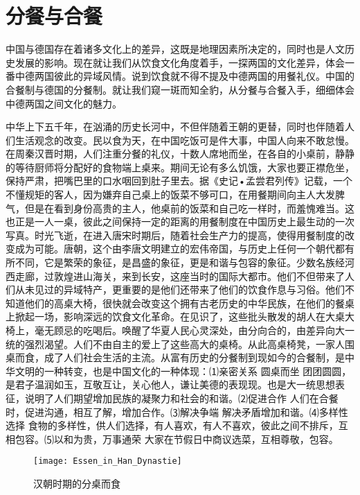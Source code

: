 \section{分餐与合餐}
\par
中国与德国存在着诸多文化上的差异，这既是地理因素所决定的，同时也是人文历史发展的影响。现在就让我们从饮食文化角度着手，一探两国的文化差异，体会一番中德两国彼此的异域风情。说到饮食就不得不提及中德两国的用餐礼仪。中国的合餐制与德国的分餐制。就让我们窥一斑而知全豹，从分餐与合餐入手，细细体会中德两国之间文化的魅力。
\par
中华上下五千年，在汹涌的历史长河中，不但伴随着王朝的更替，同时也伴随着人们生活观念的改变。民以食为天，在中国吃饭可是件大事，中国人向来不敢怠慢。在周秦汉晋时期，人们注重分餐的礼仪，十数人席地而坐，在各自的小桌前，静静的等待厨师将分配好的食物端上桌来。期间无论有多么饥饿，大家也要正襟危坐，保持严肃，把嘴巴里的口水咽回到肚子里去。据《史记•孟尝君列传》记载，一个不懂规矩的客人，因为嫌弃自己桌上的饭菜不够可口，在用餐期间向主人大发脾气，但是在看到身份高贵的主人，他桌前的饭菜和自己吃一样时，而羞愧难当。这也正是一人一桌，彼此之间保持一定的距离的用餐制度在中国历史上最生动的一次写真。时光飞逝，在进入唐宋时期后，随着社会生产力的提高，使得用餐制度的改变成为可能。唐朝，这个由李唐文明建立的宏伟帝国，与历史上任何一个朝代都有所不同，它是繁荣的象征，是昌盛的象征，更是和谐与包容的象征。少数名族经河西走廊，过敦煌进山海关，来到长安，这座当时的国际大都市。他们不但带来了人们从未见过的异域特产，更重要的是他们还带来了他们的饮食作息与习俗。他们不知道他们的高桌大椅，很快就会改变这个拥有古老历史的中华民族，在他们的餐桌上掀起一场，影响深远的饮食文化革命。在见识了，这些批头散发的胡人在大桌大椅上，毫无顾忌的吃喝后。唤醒了华夏人民心灵深处，由分向合的，由差异向大一统的强烈渴望。人们不由自主的爱上了这些高大的桌椅。从此高桌椅凳，一家人围桌而食，成了人们社会生活的主流。从富有历史的分餐制到现如今的合餐制，是中华文明的一种转变，也是中国文化的一种体现：⑴亲密关系  圆桌而坐 团团圆圆，是君子温润如玉，互敬互让，关心他人，谦让美德的表现现。也是大一统思想表征，说明了人们期望增加民族的凝聚力和社会的和谐。⑵促进合作  人们在合餐时，促进沟通，相互了解，增加合作。⑶解决争端  解决矛盾增加和谐。⑷多样性选择  食物的多样性，供人们选择，有人喜欢，有人不喜欢，彼此之间不排斥，互相包容。⑸以和为贵，万事通荣 大家在节假日中商议选菜，互相尊敬，包容。

\begin{figure}[htb]
\centering
\texttt{[image: Essen\_in\_Han\_Dynastie]}
\caption{汉朝时期的分桌而食}
\end{figure}

